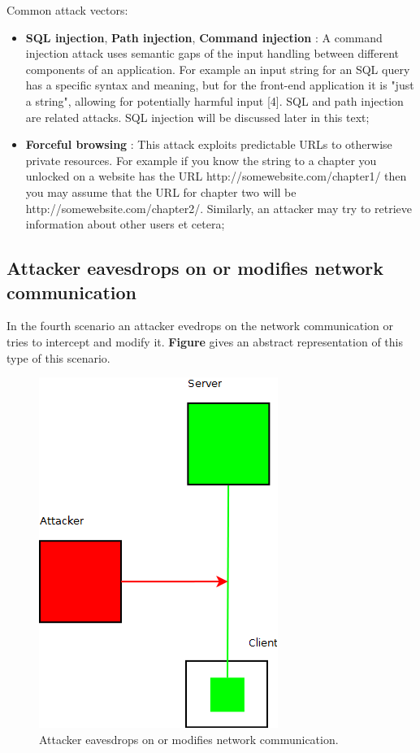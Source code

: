 Common attack vectors:
\begin{itemize}
	\item \textbf{SQL injection}, \textbf{Path injection}, \textbf{Command injection} : A command injection attack uses semantic gaps of the input handling between different components of an application. For example an input string for an SQL query has a specific syntax and meaning, but for the front-end application it is "just a string", allowing for potentially harmful input [4]. SQL and path injection are related attacks. SQL injection will be discussed later in this text;
	\item \textbf{Forceful browsing} : This attack exploits predictable URLs to otherwise private resources. For example if you know the string to a chapter you unlocked on a website has the URL http://somewebsite.com/chapter1/ then you may assume that the URL for chapter two will be http://somewebsite.com/chapter2/. Similarly, an attacker may try to retrieve information about other users et cetera;
\end{itemize}



\subsection{Attacker eavesdrops on or modifies network communication}

In the fourth scenario an attacker evedrops on the network communication or tries to intercept and modify it. \textbf{Figure} gives an abstract representation of this type of this scenario.

\begin{figure}[H]
	\begin{center}		
		\includegraphics[width=0.3\columnwidth]{img/security/threat-scenario-evesdropping}
		\caption{Attacker eavesdrops on or modifies network communication.}
		\label{fig:threat-scenario:evesdropping}
	\end{center}
\end{figure}

